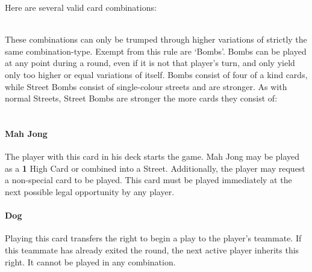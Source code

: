Here are several valid card combinations:
\\
\\

These combinations can only be trumped through higher variations of strictly the same combination-type. Exempt from this rule are ‘Bombs’. Bombs can be played at any point during a round, even if it is not that player’s turn, and only yield only too higher or equal variations of itself. Bombs consist of four of a kind cards, while Street Bombs consist of single-colour streets and are stronger. As with normal Streets, Street Bombs are stronger the more cards they consist of:
\\
\\

\paragraph*{Mah Jong}
The player with this card in his deck starts the game. Mah Jong may be played as a \textbf{1} High Card or combined into a Street. Additionally, the player may request a non-special card to be played. This card must be played immediately at the next possible legal opportunity by any player.
\paragraph*{Dog}
Playing this card transfers the right to begin a play to the player’s teammate. If this teammate has already exited the round, the next active player inherits this right. It cannot be played in any combination.
